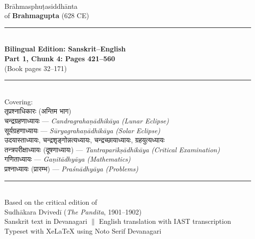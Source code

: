 \documentclass[11pt,a4paper]{article}
\newcommand{\longline}{\noindent\rule{\textwidth}{0.4pt}}
\newcommand{\dev}[1]{{\devanagarifont #1}}
\begin{document}
\thispagestyle{empty}
\begin{center}
\vspace*{1.5cm}

{\Huge\color{titlecolor}\dev{ब्रह्मस्फुटसिद्धान्त}}\\[0.6cm]
{\LARGE\color{sectioncolor} Brāhmasphuṭasiddhānta}\\[0.3cm]
{\large of \textbf{Brahmagupta} (628 CE)}\\[1cm]

\longline\\[0.6cm]

{\Large\textbf{Bilingual Edition: Sanskrit--English}}\\[0.3cm]
{\large\textbf{Part 1, Chunk 4: Pages 421--560}}\\[0.3cm]
{\normalsize (Book pages 32--171)}\\[0.6cm]

\longline\\[0.6cm]

{\normalsize Covering:}\\[0.3cm]
\dev{तृप्रश्नाधिकारः (अन्तिम भाग)}\\
\dev{चन्द्रग्रहणाध्यायः} --- \textit{Candragrahaṇādhikāya (Lunar Eclipse)}\\[0.1cm]
\dev{सूर्यग्रहणाध्यायः} --- \textit{Sūryagrahaṇādhikāya (Solar Eclipse)}\\[0.1cm]
\dev{उदयास्ताध्यायः, चन्द्रशृङ्गोन्नत्यध्यायः, चन्द्रच्छायाध्यायः, ग्रहयुत्यध्यायः}\\[0.1cm]
\dev{तन्त्रपरीक्षाध्यायः (दूषणाध्यायः)} --- \textit{Tantraparīkṣādhikāya (Critical Examination)}\\[0.1cm]
\dev{गणिताध्यायः} --- \textit{Gaṇitādhyāya (Mathematics)}\\[0.1cm]
\dev{प्रश्नाध्यायः (प्रारम्भ)} --- \textit{Praśnādhyāya (Problems)}\\[0.6cm]

\longline\\[0.6cm]

{\small Based on the critical edition of}\\
{\small Sudhākara Dvivedī (\textit{The Pandita}, 1901--1902)}\\[0.5cm]

{\footnotesize Sanskrit text in Devanagari $\parallel$ English translation with IAST transcription}\\
{\footnotesize Typeset with XeLaTeX using Noto Serif Devanagari}

\vfill
\end{center}
\end{document}
